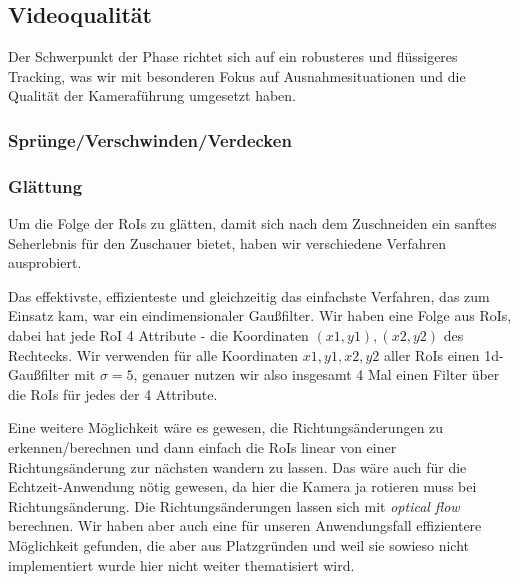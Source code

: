 \subsection*{Videoqualität}
Der Schwerpunkt der Phase richtet sich auf ein robusteres und flüssigeres Tracking, was wir mit besonderen Fokus auf Ausnahmesituationen und die Qualität der Kameraführung umgesetzt haben.



\subsubsection*{Sprünge/Verschwinden/Verdecken}

\subsubsection*{Glättung}
Um die Folge der RoIs zu glätten, damit sich nach dem Zuschneiden ein sanftes Seherlebnis für den Zuschauer bietet, haben wir verschiedene Verfahren ausprobiert.


Das effektivste, effizienteste und gleichzeitig das einfachste Verfahren, das zum Einsatz kam, war ein eindimensionaler Gaußfilter.
Wir haben eine Folge aus RoIs, dabei hat jede RoI 4 Attribute - die Koordinaten $(x1,y1), (x2,y2)$ des Rechtecks.
Wir verwenden für alle Koordinaten $x1, y1, x2, y2$ aller RoIs einen 1d-Gaußfilter mit $\sigma=5$, genauer nutzen wir also insgesamt 4 Mal einen Filter über die RoIs für jedes der 4 Attribute.

Eine weitere Möglichkeit wäre es gewesen, die Richtungsänderungen zu erkennen/berechnen und dann einfach die RoIs linear von einer Richtungsänderung zur nächsten wandern zu lassen. Das wäre auch für die Echtzeit-Anwendung nötig gewesen, da hier die Kamera ja rotieren muss bei Richtungsänderung.
Die Richtungsänderungen lassen sich mit \emph{optical flow} berechnen.
Wir haben aber auch eine für unseren Anwendungsfall effizientere Möglichkeit gefunden, die aber aus Platzgründen und weil sie sowieso nicht implementiert wurde hier nicht weiter thematisiert wird.
